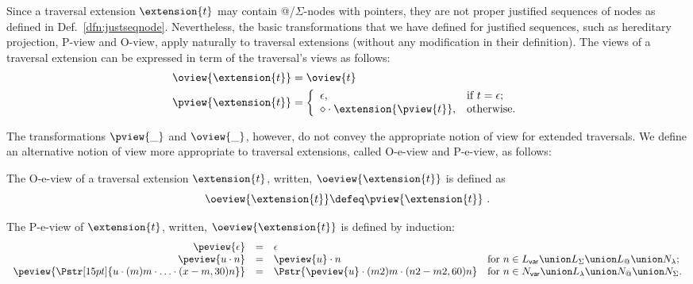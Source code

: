 Since a traversal extension $\extension{t}$ may contain @/$\Sigma$-nodes with pointers,
they are not proper justified sequences of nodes as
defined in Def.\ \ref{dfn:justseqnode}. Nevertheless, the basic transformations that we have defined for justified sequences, such as hereditary projection, P-view and O-view, apply naturally to traversal extensions (without any modification in their definition). The views of a traversal extension can be expressed in term of the traversal's views as follows:
\begin{align}
  \oview{\extension{t}} &=  \oview{t} \label{eqn:oview_exttrav_trav} \\
  \pview{\extension{t}} &=  \left\{
                            \begin{array}{ll}
                              \epsilon, & \hbox{if $t=\epsilon$;} \\
                              \diamond \cdot \extension{\pview{t}}, & \hbox{otherwise.}
                            \end{array}
                          \right. \label{eqn:pview_exttrav_trav}
\end{align}

The transformations $\pview{\_}$ and $\oview{\_}$, however, do not convey the appropriate notion
of view for extended traversals. We define an alternative notion of
view more appropriate to traversal extensions, called O-e-view and P-e-view, as follows:
\begin{definition}
\label{eqn:def_eview}

The O-e-view of a traversal extension $\extension{t}$, written, $\oeview{\extension{t}}$ is defined as
\begin{equation*}
\oeview{\extension{t}} \defeq \pview{\extension{t}} \ .
\end{equation*}

The P-e-view of $\extension{t}$, written, $\oeview{\extension{t}}$ is defined by induction:
$$\begin{array}{rcll}
 \peview{\epsilon} &=&  \epsilon \\
 \peview{u \cdot n }  &=&  \peview{u} \cdot n
    & \mbox{for $n \in L_{\sf var} \union L_\Sigma \union L_@ \union N_\lambda$;}
    \\
 \peview{\Pstr[15pt]{u \cdot (m){m} \cdot \ldots \cdot (x-m,30){n}}} &=&
    \Pstr{ \peview{u} \cdot (m2){m} \cdot (n2-m2,60){n} }
    & \mbox{for $n \in N_{\sf var} \union L_\lambda \union N_@ \union N_\Sigma$.}
\end{array}$$

\end{definition}

